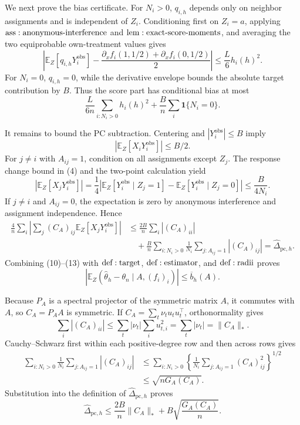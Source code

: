 We next prove the bias certificate.  For \(N_i>0\), \(q_{i,h}\) depends only on neighbor assignments and is independent of \(Z_i\).  Conditioning first on \(Z_i=a\), applying \({\rm ass:anonymous\text{-}interference}\) and \({\rm lem:exact\text{-}score\text{-}moments}\), and averaging the two equiprobable own-treatment values gives
\[
 \left|\mathbb E_Z[q_{i,h}Y_i^{\mathrm{obs}}]
 -\frac{\partial_xf_i(1,1/2)+\partial_xf_i(0,1/2)}2\right|
 \leq\frac L6h_i(h)^2.
\tag{9}
\]
For \(N_i=0\), \(q_{i,h}=0\), while the derivative envelope bounds the absolute target contribution by \(B\).  Thus the score part has conditional bias at most
\[
 \frac{L}{6n}\sum_{i:N_i>0}h_i(h)^2
 +\frac Bn\sum_i\mathbf1\{N_i=0\}.
\tag{10}
\]

It remains to bound the PC subtraction.  Centering and \(|Y_i^{\mathrm{obs}}|\leq B\) imply
\[
 |\mathbb E_Z[X_iY_i^{\mathrm{obs}}]|\leq B/2.
\tag{11}
\]
For \(j\ne i\) with \(A_{ij}=1\), condition on all assignments except \(Z_j\).  The response change bound in (4) and the two-point calculation yield
\[
 |\mathbb E_Z[X_jY_i^{\mathrm{obs}}]|
 =\frac14\left|\mathbb E_Z[Y_i^{\mathrm{obs}}\mid Z_j=1]
 -\mathbb E_Z[Y_i^{\mathrm{obs}}\mid Z_j=0]\right|
 \leq\frac B{4N_i}.
\tag{12}
\]
If \(j\ne i\) and \(A_{ij}=0\), the expectation is zero by anonymous interference and assignment independence.  Hence
\[
\begin{aligned}
 \frac4n\sum_i\left|\sum_j(C_A)_{ij}\mathbb E_Z[X_jY_i^{\mathrm{obs}}]\right|
 &\leq\frac{2B}{n}\sum_i|(C_A)_{ii}|\\
 &\quad+\frac Bn\sum_{i:N_i>0}\frac1{N_i}\sum_{j:A_{ij}=1}|(C_A)_{ij}|
 =\widehat\Delta_{\mathrm{pc},h}.
\end{aligned}
\tag{13}
\]
Combining (10)--(13) with \({\rm def:target}\), \({\rm def:estimator}\), and \({\rm def:radii}\) proves
\[
 \left|\mathbb E_Z(\widehat\theta_h-\theta_n\mid A,(f_i)_i)\right|
 \leq\overline b_h(A).
\tag{14}
\]

Because \(P_A\) is a spectral projector of the symmetric matrix \(A\), it commutes with \(A\), so \(C_A=P_AA\) is symmetric.  If \(C_A=\sum_t\nu_tu_tu_t^\top\), orthonormality gives
\[
 \sum_i|(C_A)_{ii}|
 \leq\sum_t|\nu_t|\sum_i u_{t,i}^2=\sum_t|\nu_t|=\|C_A\|_*.
\tag{15}
\]
Cauchy--Schwarz first within each positive-degree row and then across rows gives
\[
\begin{aligned}
 \sum_{i:N_i>0}\frac1{N_i}\sum_{j:A_{ij}=1}|(C_A)_{ij}|
 &\leq\sum_{i:N_i>0}
 \left\{\frac1{N_i}\sum_{j:A_{ij}=1}(C_A)_{ij}^2\right\}^{1/2}\\
 &\leq\sqrt{nG_A(C_A)}.
\end{aligned}
\tag{16}
\]
Substitution into the definition of \(\widehat\Delta_{\mathrm{pc},h}\) proves
\[
 \widehat\Delta_{\mathrm{pc},h}
 \leq\frac{2B}{n}\|C_A\|_*+B\sqrt{\frac{G_A(C_A)}n}.
\tag{17}
\]

